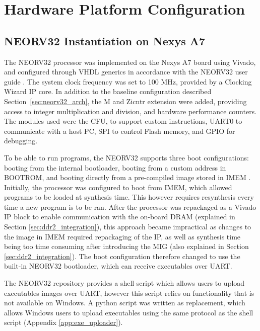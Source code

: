 \section{Hardware Platform Configuration}
\label{sec:hw_config}

\subsection{NEORV32 Instantiation on Nexys A7}
\label{sec:neorv32_instantiation}

The NEORV32 processor was implemented on the Nexys A7 board using Vivado, and configured through VHDL generics in accordance with the NEORV32 user guide \cite{Nolting2024UserGuide}. The system clock frequency was set to 100 MHz, provided by a Clocking Wizard IP core. In addition to the baseline configuration described Section~\ref{sec:neorv32_arch}, the M and Zicntr extension were added, providing access to integer multiplication and division, and hardware performance counters. The modules used were the CFU, to support custom instructions, UART0 to communicate with a host PC, SPI to control Flash memory, and GPIO for debugging.

To be able to run programs, the NEORV32 supports three boot configurations: booting from the internal bootloader, booting from a custom address in BOOTROM, and booting directly from a pre-compiled image stored in IMEM \cite{Nolting2024UserGuide}. Initially, the processor was configured to boot from IMEM, which allowed programs to be loaded at synthesis time. This however requires resynthesis every time a new program is to be ran. After the processor was repackaged as a Vivado IP block to enable communication with the on-board DRAM (explained in Section \ref{sec:ddr2_integration}), this approach became impractical as changes to the image in IMEM required repackaging of the IP, as well as synthesis time being too time consuming after introducing the MIG (also explained in Section \ref{sec:ddr2_integration}). The boot configuration therefore changed to use the built-in NEORV32 bootloader, which can receive executables over UART.

The NEORV32 repository provides a shell script which allows users to upload executables images over UART, however this script relies on functionality that is not available on Windows. A python script was written as replacement, which allows Windows users to upload executables using the same protocol as the shell script (Appendix \ref{app:exe_uploader}).

